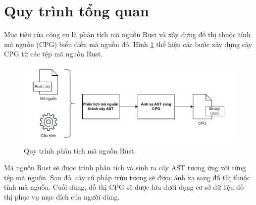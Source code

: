 \section{Quy trình tổng quan}

Mục tiêu của công cụ là phân tích mã nguồn Rust và xây dựng đồ thị thuộc tính mã
nguồn (CPG) biểu diễn mã nguồn đó.
Hình \ref{img:c3_flow} thể hiện các bước xây dựng cây CPG từ
các tệp mã nguồn Rust.

\begin{figure}[H]
	\includegraphics[width=1\columnwidth]{figures/c3/c3_flow.drawio.pdf}
	\centering
	\caption{Quy trình phân tích mã nguồn Rust.}
	\label{img:c3_flow}
\end{figure}

Mã nguồn Rust sẽ được trình phân tích và sinh ra cây AST tương ứng với từng tệp mã nguồn.
Sau đó, cây cú pháp trừu tượng sẽ được ánh xạ sang đồ thị thuộc tính mã nguồn.
Cuối dùng, đồ thị CPG sẽ được lưu dưới dạng cơ sở dữ liệu đồ thị phục vụ mục đích của người dùng.